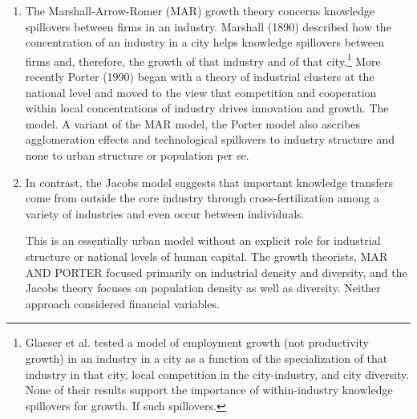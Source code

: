 
\begin{enumerate}
\item The Marshall-Arrow-Romer (MAR) growth theory concerns knowledge spillovers between firms in an industry.  Marshall (1890) described how the concentration of an industry in a city helps knowledge spillovers between firms and, therefore, the growth of that industry and of that city.\footnote{Glaeser et al. \cite{glaeserGrowthCities1991} tested a model of employment growth (not productivity growth) in an industry in a city as a function of the specialization of that industry in that city, local competition in the city-industry, and city diversity. None of their results support the importance of within-industry knowledge spillovers for growth. If such spillovers. %
} More recently Porter (1990) began with a theory of industrial clusters at the national level and moved to the view that competition and cooperation within local concentrations of industry drives innovation and growth. The model. A variant of the  MAR model, the Porter model also ascribes agglomeration effects and technological spillovers to industry structure and none to urban structure or population per se.  

\item  In contrast, the \gls{Jacobs model} %
suggests that important knowledge transfers come from outside the core industry through cross-fertilization among a variety of industries and even occur between individuals.

This is an essentially urban model without an explicit role for industrial structure or national levels of human capital.  The growth theorists, MAR AND PORTER focused primarily on industrial density and diversity, and the Jacobs theory focuses on population density as well as diversity. Neither approach considered financial variables.
\end{enumerate}




